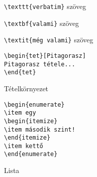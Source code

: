 \documentclass{article}
\newtheorem{tet}{Tétel}
\theoremstyle{definition}
\theoremstyle{plain}
\theoremstyle{remark}
\begin{document}

\verb|\texttt{verbatim}| szöveg

\verb|\textbf{valami}| szöveg

\verb|\textit{még valami}| szöveg

\hulipsum[2]

\begin{forraskod}
\begin{verbatim}
\begin{tet}[Pitagorasz]
Pitagorasz tétele...
\end{tet}
\end{verbatim}
\caption{Tételkörnyezet}
\end{forraskod}

\hulipsum[2]
\begin{forraskod}
\begin{verbatim}
\begin{enumerate}
\item egy
\begin{itemize}
\item második szint!
\end{itemize}
\item kettő
\end{enumerate}
\end{verbatim}
\caption{Lista}
\end{forraskod}

\hulipsum[2]
\end{document}
